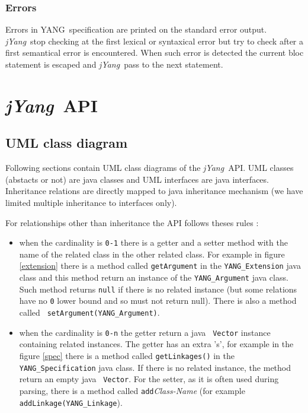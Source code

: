 \documentclass[a4paper]{article}
\newcommand{\jyang}{{\sl jYang}}
\newcommand{\y}{YANG}
\begin{document}
\subsubsection{Errors}

Errors  in \y\  specification  are printed  on  the standard  error
output. \jyang\ stop checking at the first lexical or syntaxical error
but try to  check after a first semantical  error is encountered. When
such  error is  detected the  current  bloc statement  is escaped  and
\jyang\ pass to the next statement.

\section{\jyang\ API}

\subsection{UML class diagram}

Following sections  contain UML class  diagrams of the \jyang\  API. UML
classes (abstacts or not) are java classes and UML interfaces are java
interfaces.  Inheritance   relations  are  directly   mapped  to  java
inheritance  mechanism  (we   have  limited  multiple  inheritance  to
interfaces only).

For relationships other than inheritance the API follows theses rules :
\begin{itemize}
\item
when  the cardinality  is {\tt  0-1} there  is a  getter and  a setter
method  with  the name  of  the related  class  in  the other  related
class. For example in figure  \ref{extension} there is a method called
{\tt  getArgument} in the  {\tt YANG\_Extension}  java class  and this
method return an instance of the {\tt YANG\_Argument} java class. Such
method returns  {\tt null} if there  is no related  instance (but some
relations  have  no  {\tt  0}  lower  bound and  so  must  not  return
null).     There     is      also     a     method     called     {\tt
setArgument(YANG\_Argument)}.
\item
when  the cardinality  is  {\tt 0-n}  the  getter return  a java  {\tt
Vector} instance containing related instances. The getter has an extra
's', for  example in  the figure \ref{spec}  there is a  method called
{\tt  getLinkages()} in  the {\tt  YANG\_Specification} java  class. If
there is  no related  instance, the method  return an empty  java {\tt
Vector}. For the setter, as it  is often used during parsing, there is
a  method   called  {\tt   add}{\sl  Class-Name}  (for   example  {\tt
addLinkage(YANG\_Linkage}).
\end{itemize}
 
\end{document}
